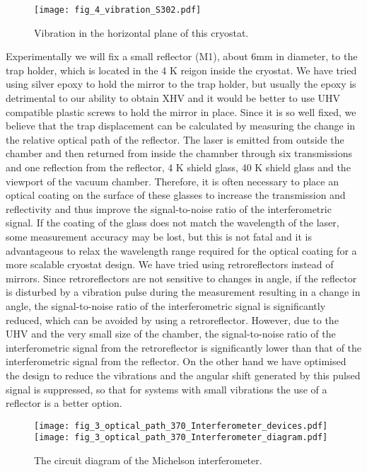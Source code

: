 \begin{figure}
    \centering
    \texttt{[image: fig\_4\_vibration\_S302.pdf]}
    \caption{Vibration in the horizontal plane of this cryostat.}
\end{figure}

Experimentally we will fix a small reflector (M1), about 6mm in diameter, to the trap holder, which is located in the 4 K reigon inside the cryostat. We have tried using silver epoxy to hold the mirror to the trap holder, but usually the epoxy is detrimental to our ability to obtain XHV and it would be better to use UHV compatible plastic screws to hold the mirror in place. Since it is so well fixed, we believe that the trap displacement can be calculated by measuring the change in the relative optical path of the reflector. The laser is emitted from outside the chamber and then returned from inside the chamnber through six transmissions and one reflection from the reflector, 4 K shield glass, 40 K shield glass and the viewport of the vacuum chamber. Therefore, it is often necessary to place an optical coating on the surface of these glasses to increase the transmission and reflectivity and thus improve the signal-to-noise ratio of the interferometric signal. If the coating of the glass does not match the wavelength of the laser, some measurement accuracy may be lost, but this is not fatal and it is advantageous to relax the wavelength range required for the optical coating for a more scalable cryostat design. We have tried using retroreflectors instead of mirrors. Since retroreflectors are not sensitive to changes in angle, if the reflector is disturbed by a vibration pulse during the measurement resulting in a change in angle, the signal-to-noise ratio of the interferometric signal is significantly reduced, which can be avoided by using a retroreflector. However, due to the UHV and the very small size of the chamber, the signal-to-noise ratio of the interferometric signal from the retroreflector is significantly lower than that of the interferometric signal from the reflector. On the other hand we have optimised the design to reduce the vibrations and the angular shift generated by this pulsed signal is suppressed, so that for systems with small vibrations the use of a reflector is a better option.

\begin{figure}
    \centering
    {\texttt{[image: fig\_3\_optical\_path\_370\_Interferometer\_devices.pdf]}}
    {\texttt{[image: fig\_3\_optical\_path\_370\_Interferometer\_diagram.pdf]}}
    \caption{The circuit diagram of the Michelson interferometer.}
\end{figure}

